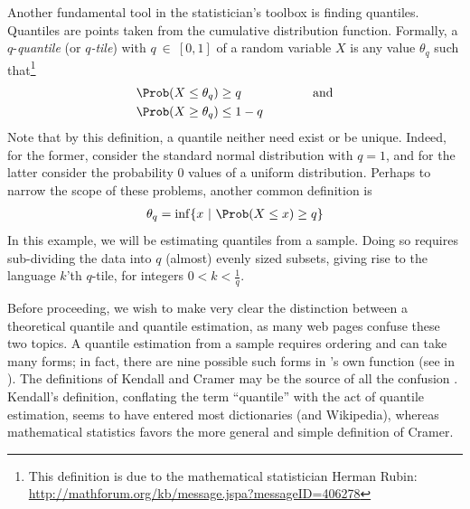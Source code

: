 Another fundamental tool in the statistician's toolbox is finding quantiles.
Quantiles are points taken from the cumulative distribution function.
Formally, a $q$-\emph{quantile} (or \emph{$q$-tile}) with $q~\in~[0,1]$ of
a random variable $X$ is any value $\theta_q$ such
that\footnote{This definition is due to the mathematical statistician Herman
Rubin: \url{http://mathforum.org/kb/message.jspa?messageID=406278}}
\begin{align*}
\Prob(X\leq \theta_q) &\geq q\hspace{2cm}\text{and}\\
\Prob(X\geq \theta_q) &\leq 1-q
\end{align*}
Note that by this definition, a quantile neither need exist or be unique.
Indeed, for the former, consider the
standard normal distribution with
$q=1$, and for the latter consider the probability 0 values of a uniform
distribution. Perhaps to narrow the scope of these problems, another
common definition is
\begin{align*}
\theta_q = \inf \{x\ |\ \Prob(X\leq x) \geq q\}
\end{align*}
In this example, we will be estimating quantiles from a sample.
Doing so requires sub-dividing the data into $q$ (almost) evenly
sized subsets, giving rise to the language $k$'th $q$-tile, for
integers $0<k<\frac{1}{q}$.

Before proceeding, we wish to make very clear the distinction between a
theoretical quantile and quantile estimation, as many web pages confuse
these two topics.  A quantile estimation from a sample requires ordering
and can take many forms; in fact, there are nine possible such forms
in 's own 
function (see 
in ). The definitions of Kendall and Cramer may be the source
of all the confusion \citep{quantilemess}. Kendall's definition, conflating
the term ``quantile'' with the act of quantile estimation, seems to have
entered most dictionaries (and Wikipedia), whereas mathematical statistics
favors the more general and simple definition of Cramer.

